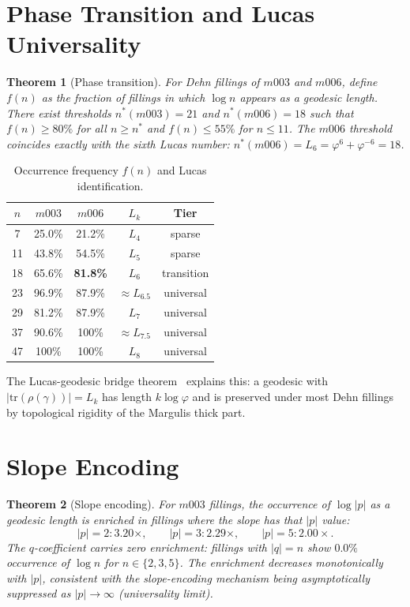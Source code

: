 \documentclass[12pt]{article}
\newtheorem{theorem}{Theorem}
\theoremstyle{definition}
\newcommand{\ph}{\varphi}
\begin{document}
\section{Phase Transition and Lucas Universality}

\begin{theorem}[Phase transition]
For Dehn fillings of $m003$ and $m006$, define $f(n)$ as the fraction
of fillings in which $\log n$ appears as a geodesic length.
There exist thresholds $n^*(m003) = 21$ and $n^*(m006) = 18$ such that
$f(n) \ge 80\%$ for all $n \ge n^*$ and $f(n) \le 55\%$ for $n \le 11$.
The $m006$ threshold coincides exactly with the sixth Lucas number:
$n^*(m006) = L_6 = \ph^6 + \ph^{-6} = 18$.
\end{theorem}

\begin{table}[htbp]
\centering
\caption{Occurrence frequency $f(n)$ and Lucas identification.}
\label{tab:main}
\begin{tabular}{ccccc}
\toprule
$n$ & $m003$ & $m006$ & $L_k$ & Tier \\
\midrule
 7 & 25.0\% & 21.2\% & $L_4$ & sparse \\
11 & 43.8\% & 54.5\% & $L_5$ & sparse \\
18 & 65.6\% & \textbf{81.8\%} & $L_6$ & transition \\
23 & 96.9\% & 87.9\% & $\approx L_{6.5}$ & universal \\
29 & 81.2\% & 87.9\% & $L_7$ & universal \\
37 & 90.6\% & 100\% & $\approx L_{7.5}$ & universal \\
47 & 100\% & 100\% & $L_8$ & universal \\
\bottomrule
\end{tabular}
\end{table}

The Lucas-geodesic bridge theorem~\cite{Gentry:Lucas} explains this:
a geodesic with $|\mathrm{tr}(\rho(\gamma))| = L_k$ has length
$k\log\ph$ and is preserved under most Dehn fillings by topological
rigidity of the Margulis thick part.

\section{Slope Encoding}

\begin{theorem}[Slope encoding]
For $m003$ fillings, the occurrence of $\log|p|$ as a geodesic length
is enriched in fillings where the slope has that $|p|$ value:
\[
|p|=2: 3.20\times,\qquad |p|=3: 2.29\times,\qquad |p|=5: 2.00\times.
\]
The $q$-coefficient carries zero enrichment: fillings with $|q|=n$
show $0.0\%$ occurrence of $\log n$ for $n\in\{2,3,5\}$.
The enrichment decreases monotonically with $|p|$, consistent with
the slope-encoding mechanism being asymptotically suppressed as
$|p|\to\infty$ (universality limit).
\end{theorem}
\end{document}
